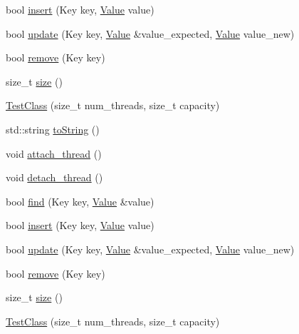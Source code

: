 \begin{DoxyCompactItemize}
\item 
bool \hyperlink{class_test_class_a0d075565ad4cccdb071bf267fe444681}{insert} (Key key, \hyperlink{hash__map_2test_object_8h_ad777bf08d8e2b01df17ba5e3c51ae11f}{Value} value)
\item 
bool \hyperlink{class_test_class_a4c33c8cac20119f9bee9b5091bc8a385}{update} (Key key, \hyperlink{hash__map_2test_object_8h_ad777bf08d8e2b01df17ba5e3c51ae11f}{Value} \&value\+\_\+expected, \hyperlink{hash__map_2test_object_8h_ad777bf08d8e2b01df17ba5e3c51ae11f}{Value} value\+\_\+new)
\item 
bool \hyperlink{class_test_class_a3a22d60709c15d419f69d29b7de92d02}{remove} (Key key)
\item 
size\+\_\+t \hyperlink{class_test_class_af2230f298ab3ef4ebf71aa7afa3fb6ca}{size} ()
\item 
\hyperlink{class_test_class_ab3dbc7a67da46dda1125f7dee533aca2}{Test\+Class} (size\+\_\+t num\+\_\+threads, size\+\_\+t capacity)
\item 
std\+::string \hyperlink{class_test_class_a84e73a91ede625887472a307235d6de5}{to\+String} ()
\item 
void \hyperlink{class_test_class_a7e6bce4c39c047282ea8c1f1485a260b}{attach\+\_\+thread} ()
\item 
void \hyperlink{class_test_class_a79b3a395c8a1fac7a156228a27d829cc}{detach\+\_\+thread} ()
\item 
bool \hyperlink{class_test_class_af497b95115e81f882851b2ab843c298c}{find} (Key key, \hyperlink{hash__map_2test_object_8h_ad777bf08d8e2b01df17ba5e3c51ae11f}{Value} \&value)
\item 
bool \hyperlink{class_test_class_a0d075565ad4cccdb071bf267fe444681}{insert} (Key key, \hyperlink{hash__map_2test_object_8h_ad777bf08d8e2b01df17ba5e3c51ae11f}{Value} value)
\item 
bool \hyperlink{class_test_class_a4c33c8cac20119f9bee9b5091bc8a385}{update} (Key key, \hyperlink{hash__map_2test_object_8h_ad777bf08d8e2b01df17ba5e3c51ae11f}{Value} \&value\+\_\+expected, \hyperlink{hash__map_2test_object_8h_ad777bf08d8e2b01df17ba5e3c51ae11f}{Value} value\+\_\+new)
\item 
bool \hyperlink{class_test_class_a3a22d60709c15d419f69d29b7de92d02}{remove} (Key key)
\item 
size\+\_\+t \hyperlink{class_test_class_af2230f298ab3ef4ebf71aa7afa3fb6ca}{size} ()
\item 
\hyperlink{class_test_class_ab3dbc7a67da46dda1125f7dee533aca2}{Test\+Class} (size\+\_\+t num\+\_\+threads, size\+\_\+t capacity)

\end{DoxyCompactItemize}
